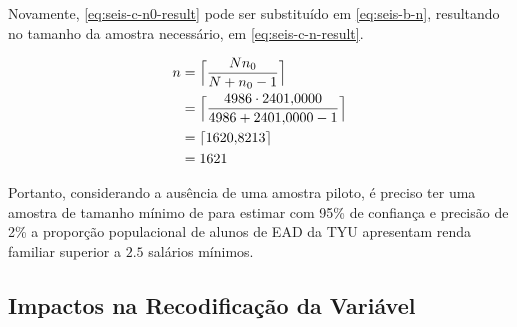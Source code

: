	Novamente, \eqref{eq:seis-c-n0-result} pode ser substituído em
	\eqref{eq:seis-b-n}, resultando no tamanho da amostra necessário, em
	\eqref{eq:seis-c-n-result}.

	\begin{align}
		n &= \Big\lceil \frac{N n_0}{N + n_0 - 1} \nonumber \Big\rceil \\
		  &= \Big\lceil \frac{4986 \cdot \num{2401.0000}}{4986 + \num{2401.0000} - 1} \Big\rceil \nonumber \\
		  &= \lceil \num{1620.8213} \rceil \nonumber \\
		  &= \label{eq:seis-c-n-result} 
			 1621
	\end{align}

	Portanto, considerando a ausência de uma amostra piloto, é preciso ter uma
	amostra de tamanho mínimo de \SEISCnceil para estimar com 95\% de
	confiança e precisão de 2\% a proporção populacional de alunos de EAD da TYU
	apresentam renda familiar superior a $\num{2,5}$ salários mínimos.

\subsection{Impactos na Recodificação da Variável}

